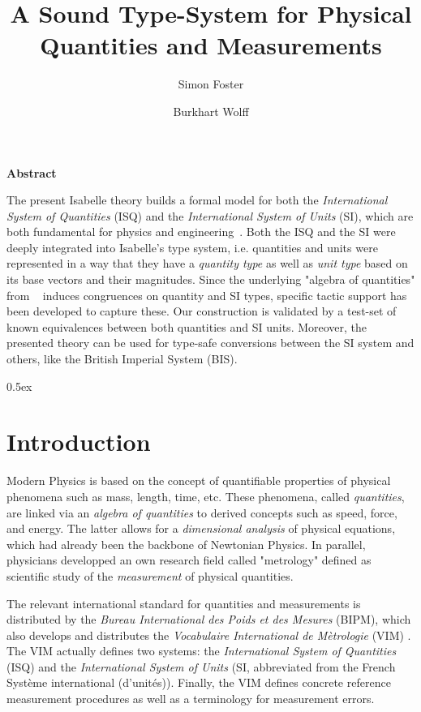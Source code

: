 \documentclass[11pt,a4paper]{book}
\begin{document}
\title{A Sound Type-System for Physical Quantities and Measurements}
\author{Simon Foster \and Burkhart Wolff}
\maketitle

\textbf{ Abstract } 

The present Isabelle theory builds a formal model for both the \emph{International System of Quantities}
(ISQ) and the \emph{International System of Units} (SI), which are both fundamental for physics
and engineering~\cite{bipm-jcgm:2012:VIM}. Both the ISQ and the SI were deeply integrated into 
Isabelle's type system, i.e. quantities and units were represented in a way that 
they have a  \emph{quantity type} as well as \emph{unit type} based on its base vectors and their 
magnitudes. Since the underlying "algebra of quantities" from ~\cite{bipm-jcgm:2012:VIM} induces 
congruences on  quantity and SI types, specific tactic support has been developed to capture these.
Our construction is validated by a test-set of known equivalences between both quantities and SI units.
Moreover, the presented theory can be used for type-safe conversions between the SI system and
others, like the British Imperial System (BIS).

\tableofcontents

\parindent 0pt\parskip 0.5ex


\chapter{Introduction}

Modern Physics is based on the concept of quantifiable properties of physical phenomena such 
as mass, length, time, etc. These phenomena, called \emph{quantities}, are linked via an 
\emph{algebra of quantities} to derived concepts such as speed, force, and energy. The latter 
allows for a \emph{dimensional analysis} of physical equations, which had already been the 
backbone of Newtonian Physics. In parallel, physicians developped an own research field called 
"metrology" defined as scientific study of the \emph{measurement} of physical quantities.


The relevant international standard for quantities and measurements is distributed by the
\emph{Bureau International des Poids et des Mesures} (BIPM), which also develops and distributes
the \emph{Vocabulaire International de M\`etrologie} (VIM) \cite{bipm-jcgm:2012:VIM}.
The VIM actually defines two systems: the \emph{International System of Quantities}
(ISQ) and the \emph{International System of Units} (SI, abbreviated from the French  Syst\`eme 
international (d’unit\'es)). Finally, the VIM defines concrete reference measurement procedures 
as well as a terminology for measurement errors. 
\end{document}
